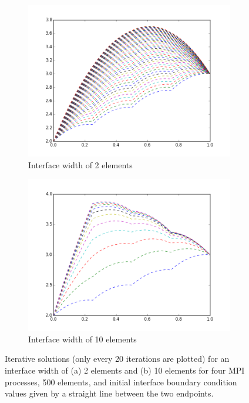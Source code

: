 \documentclass[10pt]{article}
\begin{document}
\begin{figure}[H]
        \centering
        \begin{subfigure}[b]{0.5\textwidth}
                \centering
                \includegraphics[width=\textwidth]{../figures/interface1.png}
                \caption{Interface width of 2 elements}
        \end{subfigure}%
                \begin{subfigure}[b]{0.5\textwidth}
                \centering
                \includegraphics[width=\textwidth]{../figures/interface2.png}
                \caption{Interface width of 10 elements}
        \end{subfigure}%
        \caption{Iterative solutions (only every 20 iterations are plotted) for an interface width of (a) 2 elements and (b) 10 elements for four MPI processes, 500 elements, and initial interface boundary condition values given by a straight line between the two endpoints.}
\label{fig:interface}
\end{figure}
\end{document}
